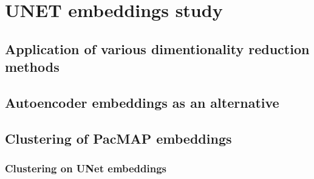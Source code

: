 \section{UNET embeddings study}
    \subsection{Application of various dimentionality reduction methods}
        
    \subsection{Autoencoder embeddings as an alternative}
        
    \clearpage
    \subsection{Clustering of PacMAP embeddings}
        \subsubsection{Clustering on UNet embeddings}
        